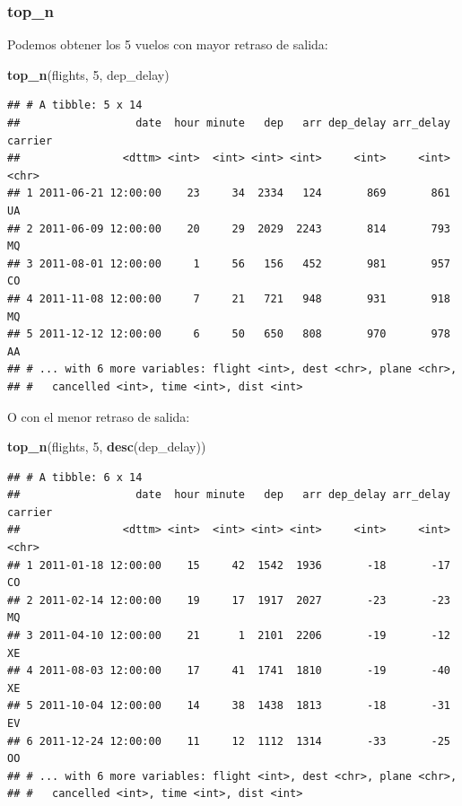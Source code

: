 \documentclass[]{article}
\newenvironment{Shaded}{\begin{snugshade}}{\end{snugshade}}
\newcommand{\KeywordTok}[1]{\textcolor[rgb]{0.13,0.29,0.53}{\textbf{#1}}}
\newcommand{\DecValTok}[1]{\textcolor[rgb]{0.00,0.00,0.81}{#1}}
\newcommand{\NormalTok}[1]{#1}
\begin{document}
\subsubsection{top\_n}\label{top_n}

Podemos obtener los 5 vuelos con mayor retraso de salida:

\begin{Shaded}
\begin{Highlighting}[]
\KeywordTok{top_n}\NormalTok{(flights, }\DecValTok{5}\NormalTok{, dep_delay)}
\end{Highlighting}
\end{Shaded}

\begin{verbatim}
## # A tibble: 5 x 14
##                  date  hour minute   dep   arr dep_delay arr_delay carrier
##                <dttm> <int>  <int> <int> <int>     <int>     <int>   <chr>
## 1 2011-06-21 12:00:00    23     34  2334   124       869       861      UA
## 2 2011-06-09 12:00:00    20     29  2029  2243       814       793      MQ
## 3 2011-08-01 12:00:00     1     56   156   452       981       957      CO
## 4 2011-11-08 12:00:00     7     21   721   948       931       918      MQ
## 5 2011-12-12 12:00:00     6     50   650   808       970       978      AA
## # ... with 6 more variables: flight <int>, dest <chr>, plane <chr>,
## #   cancelled <int>, time <int>, dist <int>
\end{verbatim}

O con el menor retraso de salida:

\begin{Shaded}
\begin{Highlighting}[]
\KeywordTok{top_n}\NormalTok{(flights, }\DecValTok{5}\NormalTok{, }\KeywordTok{desc}\NormalTok{(dep_delay))}
\end{Highlighting}
\end{Shaded}

\begin{verbatim}
## # A tibble: 6 x 14
##                  date  hour minute   dep   arr dep_delay arr_delay carrier
##                <dttm> <int>  <int> <int> <int>     <int>     <int>   <chr>
## 1 2011-01-18 12:00:00    15     42  1542  1936       -18       -17      CO
## 2 2011-02-14 12:00:00    19     17  1917  2027       -23       -23      MQ
## 3 2011-04-10 12:00:00    21      1  2101  2206       -19       -12      XE
## 4 2011-08-03 12:00:00    17     41  1741  1810       -19       -40      XE
## 5 2011-10-04 12:00:00    14     38  1438  1813       -18       -31      EV
## 6 2011-12-24 12:00:00    11     12  1112  1314       -33       -25      OO
## # ... with 6 more variables: flight <int>, dest <chr>, plane <chr>,
## #   cancelled <int>, time <int>, dist <int>
\end{verbatim}
\end{document}
